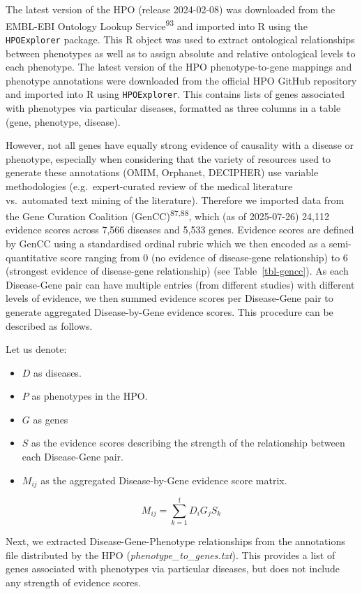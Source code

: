 \documentclass[
]{article}
\begin{document}
The latest version of the HPO (release 2024-02-08) was downloaded from
the EMBL-EBI Ontology Lookup Service\textsuperscript{93} and imported
into R using the \texttt{HPOExplorer} package. This R object was used to
extract ontological relationships between phenotypes as well as to
assign absolute and relative ontological levels to each phenotype. The
latest version of the HPO phenotype-to-gene mappings and phenotype
annotations were downloaded from the official HPO GitHub repository and
imported into R using \texttt{HPOExplorer}. This contains lists of genes
associated with phenotypes via particular diseases, formatted as three
columns in a table (gene, phenotype, disease).

However, not all genes have equally strong evidence of causality with a
disease or phenotype, especially when considering that the variety of
resources used to generate these annotations (OMIM, Orphanet, DECIPHER)
use variable methodologies (e.g.~expert-curated review of the medical
literature vs.~automated text mining of the literature). Therefore we
imported data from the Gene Curation Coalition
(GenCC)\textsuperscript{87,88}, which (as of 2025-07-26) 24,112 evidence
scores across 7,566 diseases and 5,533 genes. Evidence scores are
defined by GenCC using a standardised ordinal rubric which we then
encoded as a semi-quantitative score ranging from 0 (no evidence of
disease-gene relationship) to 6 (strongest evidence of disease-gene
relationship) (see Table~\ref{tbl-gencc}). As each Disease-Gene pair can
have multiple entries (from different studies) with different levels of
evidence, we then summed evidence scores per Disease-Gene pair to
generate aggregated Disease-by-Gene evidence scores. This procedure can
be described as follows.

Let us denote:

\begin{itemize}
\item
  \(D\) as diseases.
\item
  \(P\) as phenotypes in the HPO.
\item
  \(G\) as genes
\item
  \(S\) as the evidence scores describing the strength of the
  relationship between each Disease-Gene pair.
\item
  \(M_{ij}\) as the aggregated Disease-by-Gene evidence score matrix.
\end{itemize}

\[
M_{ij} = \sum_{k=1}^{\text{f}} D_i G_j S_k
\]

Next, we extracted Disease-Gene-Phenotype relationships from the
annotations file distributed by the HPO
(\emph{phenotype\_to\_genes.txt}). This provides a list of genes
associated with phenotypes via particular diseases, but does not include
any strength of evidence scores.
\end{document}
